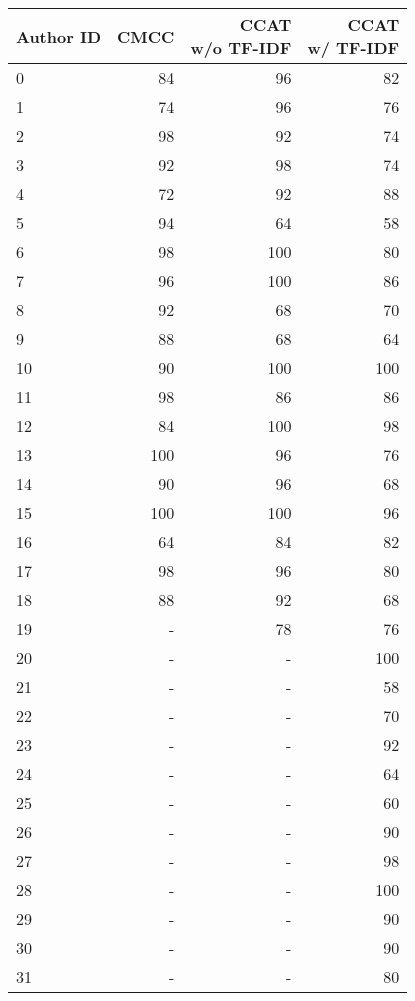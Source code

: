 



         
\begin{table*}[t]
    \centering
    \begin{tabular}{lrrr}
        \hline
        Author ID & CMCC & \makecell{CCAT\\w/o TF-IDF} & \makecell{CCAT\\w/ TF-IDF} \\
        \hline
        0 & 84 & 96 & 82 \\
        1 & 74 & 96 & 76 \\
        2 & 98 & 92 & 74 \\
        3 & 92 & 98 & 74 \\
        4 & 72 & 92 & 88 \\
        5 & 94 & 64 & 58 \\
        6 & 98 & 100 & 80 \\
        7 & 96 & 100 & 86 \\
        8 & 92 & 68 & 70 \\
        9 & 88 & 68 & 64 \\
        10 & 90 & 100 & 100 \\
        11 & 98 & 86 & 86 \\
        12 & 84 & 100 & 98 \\
        13 & 100 & 96 & 76 \\
        14 & 90 & 96 & 68 \\
        15 & 100 & 100 & 96 \\
        16 & 64 & 84 & 82 \\
        17 & 98 & 96 & 80 \\
        18 & 88 & 92 & 68 \\
        19 & - & 78 & 76 \\
        20 & - & - & 100 \\
        21 & - & - & 58 \\
        22 & - & - & 70 \\
        23 & - & - & 92 \\
        24 & - & - & 64 \\
        25 & - & - & 60 \\
        26 & - & - & 90 \\
        27 & - & - & 98 \\
        28 & - & - & 100 \\
        29 & - & - & 90 \\
        30 & - & - & 90 \\
        31 & - & - & 80 \\

\end{tabular}
\end{table*}
